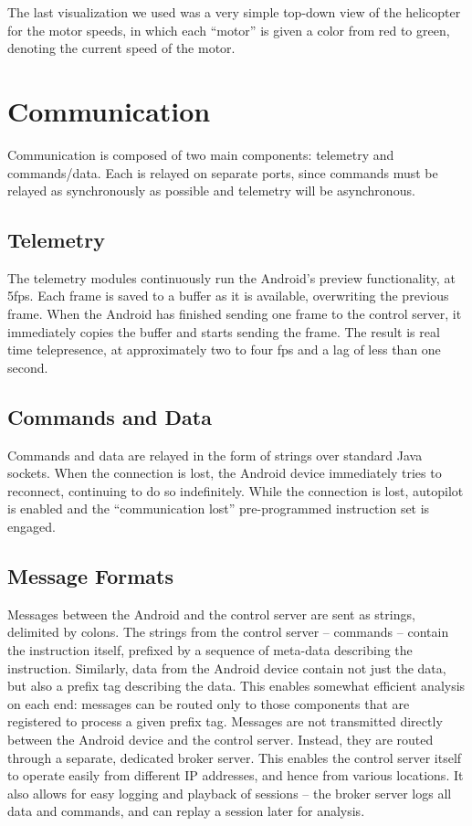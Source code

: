 The last visualization we used was a very simple top-down view of the
helicopter for the motor speeds, in which each ``motor'' is given a
color from red to green, denoting the current speed of the motor.

\section{Communication}
Communication is composed of two main components:‭ ‬telemetry and
commands/data.‭ ‬Each is relayed on separate ports,‭ ‬since commands must
be relayed as synchronously as possible and telemetry will be
asynchronous.

\subsection{Telemetry}
The telemetry modules continuously run the Android's preview
functionality,‭ ‬at‭ ‬5fps.‭  ‬Each frame is saved to a buffer as it is
available,‭ ‬overwriting the previous frame.‭  ‬When the Android has
finished sending one frame to the control server,‭ ‬it immediately
copies the buffer and starts sending the frame.‭  ‬The result is real
time telepresence,‭ ‬at approximately two to four fps and a lag of
less than one second.

\subsection{Commands and Data}
Commands and data are relayed in the form of strings over standard
Java sockets.‭ ‬When the connection is lost,‭ ‬the Android device
immediately tries to reconnect,‭ ‬continuing to do so indefinitely.‭
‬While the connection is lost, autopilot is enabled and the‭
``‬communication lost‭'' pre-programmed instruction set is engaged.

\subsection{Message Formats}
\label{sec:msgs}
‏Messages between the Android and the control server are sent as
strings,‭ ‬delimited by colons.‭ ‬The strings from the control server --
commands -- contain the instruction itself,‭ ‬prefixed by a sequence of
meta-data describing the instruction.‭ ‬Similarly,‭ ‬data from the Android
device contain not just the data,‭ ‬but also a prefix tag describing the
data.‭ ‬This enables somewhat efficient analysis on each end:‭ ‬messages can
be routed only to those components that are registered to process a
given prefix tag.  Messages are not transmitted directly between the
Android device and the control server.‭ ‬Instead,‭ ‬they are routed through
a separate,‭ ‬dedicated broker server.‭ ‬This enables the control server
itself to operate easily from different IP addresses,‭ ‬and hence from
various locations. It also allows for easy logging and playback of
sessions -- the broker server logs all data and commands, and can replay
a session later for analysis.

